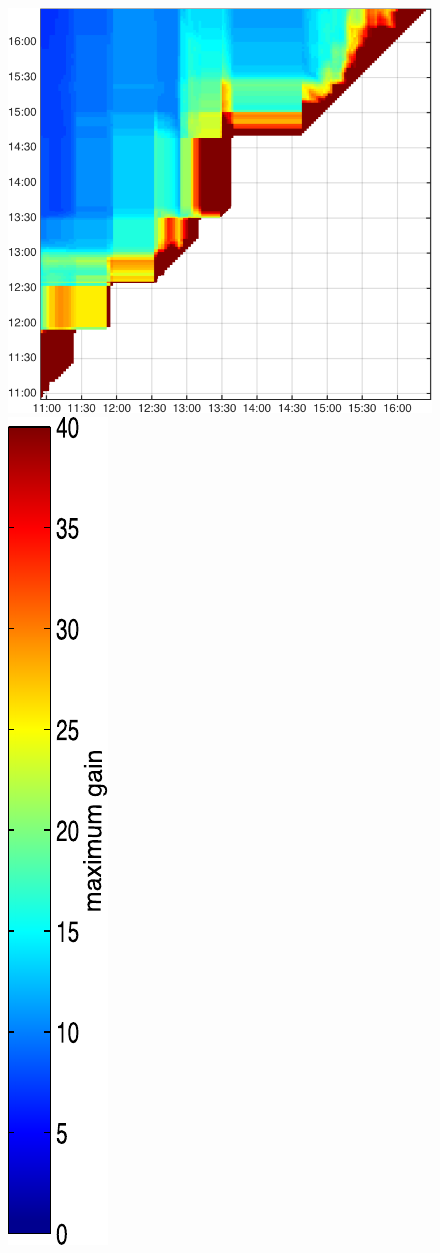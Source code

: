\begin{figure}
\begin{minipage}[c]{\mylength}
\includegraphics[valign=t,width=\eventswidth]{events/20141102-maxGain-local-events.png}
\includegraphics[valign=t,trim=2pt -8pt 0 5pt,width=\colorbarwidth,totalheight=\eventheight]{events/colorbar-40.pdf}

\end{minipage}
\end{figure}
